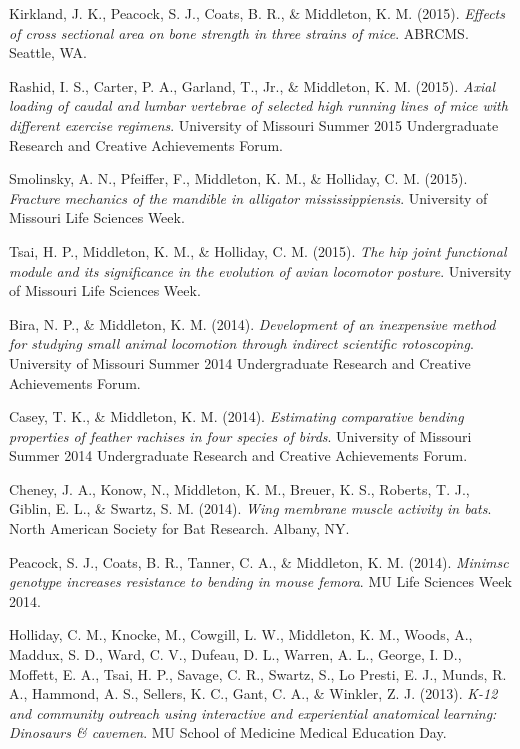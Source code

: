 \documentclass[11pt, a4paper]{awesome-cv}
\begin{document}
\leavevmode\hypertarget{ref-kirkland_effects_2015a}{}%
Kirkland, J. K., Peacock, S. J., Coats, B. R., \& Middleton, K. M.
(2015). \emph{Effects of cross sectional area on bone strength in three
strains of mice}. ABRCMS. Seattle, WA.

\leavevmode\hypertarget{ref-rashid_axial_2015}{}%
Rashid, I. S., Carter, P. A., Garland, T., Jr., \& Middleton, K. M.
(2015). \emph{Axial loading of caudal and lumbar vertebrae of selected
high running lines of mice with different exercise regimens}. University
of Missouri Summer 2015 Undergraduate Research and Creative Achievements
Forum.

\leavevmode\hypertarget{ref-smolinsky_fracture_2015}{}%
Smolinsky, A. N., Pfeiffer, F., Middleton, K. M., \& Holliday, C. M.
(2015). \emph{Fracture mechanics of the mandible in \textup{alligator
mississippiensis}}. University of Missouri Life Sciences Week.

\leavevmode\hypertarget{ref-tsai_hip_2015}{}%
Tsai, H. P., Middleton, K. M., \& Holliday, C. M. (2015). \emph{The hip
joint functional module and its significance in the evolution of avian
locomotor posture}. University of Missouri Life Sciences Week.

\leavevmode\hypertarget{ref-bira_development_2014}{}%
Bira, N. P., \& Middleton, K. M. (2014). \emph{Development of an
inexpensive method for studying small animal locomotion through indirect
scientific rotoscoping}. University of Missouri Summer 2014
Undergraduate Research and Creative Achievements Forum.

\leavevmode\hypertarget{ref-casey_estimating_2014}{}%
Casey, T. K., \& Middleton, K. M. (2014). \emph{Estimating comparative
bending properties of feather rachises in four species of birds}.
University of Missouri Summer 2014 Undergraduate Research and Creative
Achievements Forum.

\leavevmode\hypertarget{ref-cheney_wing_2014}{}%
Cheney, J. A., Konow, N., Middleton, K. M., Breuer, K. S., Roberts, T.
J., Giblin, E. L., \& Swartz, S. M. (2014). \emph{Wing membrane muscle
activity in bats}. North American Society for Bat Research. Albany, NY.

\leavevmode\hypertarget{ref-peacock_minimsc_2014}{}%
Peacock, S. J., Coats, B. R., Tanner, C. A., \& Middleton, K. M. (2014).
\emph{\textup{Minimsc} genotype increases resistance to bending in mouse
femora}. MU Life Sciences Week 2014.

\leavevmode\hypertarget{ref-holliday_12_2013}{}%
Holliday, C. M., Knocke, M., Cowgill, L. W., Middleton, K. M., Woods,
A., Maddux, S. D., Ward, C. V., Dufeau, D. L., Warren, A. L., George, I.
D., Moffett, E. A., Tsai, H. P., Savage, C. R., Swartz, S., Lo Presti,
E. J., Munds, R. A., Hammond, A. S., Sellers, K. C., Gant, C. A., \&
Winkler, Z. J. (2013). \emph{K-12 and community outreach using
interactive and experiential anatomical learning: Dinosaurs \& cavemen}.
MU School of Medicine Medical Education Day.
\end{document}
